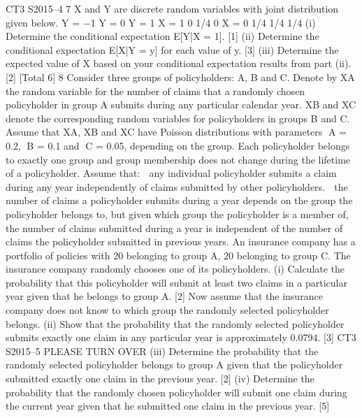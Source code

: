 \documentclass[a4paper,12pt]{article}
\begin{document}
\begin{enumerate}
CT3 S2015–4
7 X and Y are discrete random variables with joint distribution given below.
Y = −1 Y = 0 Y = 1
X = 1 0 1/4 0
X = 0 1/4 1/4 1/4
(i) Determine the conditional expectation E[Y|X = 1]. [1]
(ii) Determine the conditional expectation E[X|Y = y] for each value of y. [3]
(iii) Determine the expected value of X based on your conditional expectation
results from part (ii). [2]
[Total 6]
8 Consider three groups of policyholders: A, B and C. Denote by XA the random
variable for the number of claims that a randomly chosen policyholder in group A
submits during any particular calendar year. XB and XC denote the corresponding
random variables for policyholders in groups B and C.
Assume that XA, XB and XC have Poisson distributions with parameters A = 0.2,
B = 0.1 and C = 0.05, depending on the group.
Each policyholder belongs to exactly one group and group membership does not
change during the lifetime of a policyholder.
Assume that:
   any individual policyholder submits a claim during any year independently of
claims submitted by other policyholders.
 the number of claims a policyholder submits during a year depends on the group
the policyholder belongs to, but given which group the policyholder is a member
of, the number of claims submitted during a year is independent of the number of
claims the policyholder submitted in previous years.
An insurance company has a portfolio of policies with 20%
belonging to group A, 20%
belonging to group C.
The insurance company randomly chooses one of its policyholders.
(i) Calculate the probability that this policyholder will submit at least two claims
in a particular year given that he belongs to group A. [2]
Now assume that the insurance company does not know to which group the randomly
selected policyholder belongs.
(ii) Show that the probability that the randomly selected policyholder submits
exactly one claim in any particular year is approximately 0.0794. [3]
CT3 S2015–5 PLEASE TURN OVER
(iii) Determine the probability that the randomly selected policyholder belongs to
group A given that the policyholder submitted exactly one claim in the
previous year. [2]
(iv) Determine the probability that the randomly chosen policyholder will submit
one claim during the current year given that he submitted one claim in the
previous year. [5]


\end{enumerate}
\end{document}
